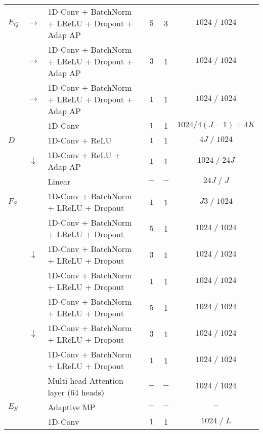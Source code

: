 \begin{table*}[bht]
{\begin{tabular}{| l | c | l | c | c | c |}
\hline
$E_Q$ & $\rightarrow$ &1D-Conv + BatchNorm + LReLU + Dropout + Adap AP & $5$ & 3 & $1024\; /\; 1024$\\
& $\rightarrow$ &1D-Conv + BatchNorm + LReLU + Dropout + Adap AP & $3$ & 1 & $1024\; /\; 1024$\\
& $\rightarrow$ &1D-Conv + BatchNorm + LReLU + Dropout + Adap AP & $1$ & 1 & $1024\; /\; 1024$\\
\cline{2-5}
& & 1D-Conv & $1$ & 1 & $1024 / 4(J\!-\!1)\!+\!4K$\\
\hline
\midrule %
$D$ & & 1D-Conv + ReLU  & $1$ & 1 & $4J \; /\; 1024$\\
& $\downarrow$&1D-Conv + ReLU + Adap AP & $1$ & 1 & $1024\; /\; 24J$\\
& &Linear & $-$ & $-$ & $24J \; /\; J$\\
\hline
\midrule %
$F_S$ & & 1D-Conv + BatchNorm + LReLU + Dropout  & $1$ & 1 & $J3\; /\; 1024$\\
\cline{2-5}
& &1D-Conv + BatchNorm + LReLU + Dropout & $5$ & 1 & $1024\; /\; 1024$\\
& $\downarrow$ &1D-Conv + BatchNorm + LReLU + Dropout & $3$ & 1 & $1024\; /\; 1024$\\
& &1D-Conv + BatchNorm + LReLU + Dropout & $1$ & 1 & $1024\; /\; 1024$\\
\cline{2-5}
& &1D-Conv + BatchNorm + LReLU + Dropout & $5$ & 1 & $1024\; /\; 1024$\\
& $\downarrow$ &1D-Conv + BatchNorm + LReLU + Dropout & $3$ & 1 & $1024\; /\; 1024$\\
& &1D-Conv + BatchNorm + LReLU + Dropout & $1$ & 1 & $1024\; /\; 1024$\\
\cline{2-5}
& & Multi-head Attention layer (64 heads) & $-$ & $-$ & $1024\; /\; 1024$\\

\hline
$E_S$ & &Adaptive MP & $-$ & $-$ & $-$\\
& &1D-Conv & $1$ & 1 & $1024\; /\; L$\\
\hline
\bottomrule
\end{tabular}
} %
\setlength{\abovecaptionskip}{0pt plus 3pt minus 2pt}
\setlength{\belowcaptionskip}{-20pt plus 3pt minus 2pt}
\caption*{}
\label{tab:layer_detail}
\end{table*}